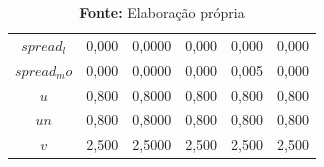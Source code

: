 \begin{table}[htb]
\begin{tabular}{cccccc}
\textbf{$spread_l$ } &          0,000 &        0,0000 &            0,000 &        0,000 &            0,000 \\
\textbf{$spread_mo$} &          0,000 &        0,0000 &            0,000 &        0,005 &            0,000 \\
\textbf{$u$        } &          0,800 &        0,8000 &            0,800 &        0,800 &            0,800 \\
\textbf{$un$       } &          0,800 &        0,8000 &            0,800 &        0,800 &            0,800 \\
\textbf{$v$        } &          2,500 &        2,5000 &            2,500 &        2,500 &            2,500 \\
\bottomrule
\end{tabular}
    \label{Summary_Simplest}
    \caption*{\textbf{Fonte:} Elaboração própria}
\end{table}
